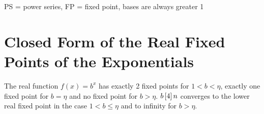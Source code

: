 \documentclass{article}
\numberwithin{equation}{section}
\begin{document}
PS = power series, FP = fixed point, bases are always
greater 1

\appendix
\section{Closed Form of the Real Fixed Points of the Exponentials}
\begin{wellknown}
  \label{wk:exponential:fixedpoint:real}
  The real function $f(x)=b^x$ has exactly 2 fixed points
  for $1<b<\eta$, exactly one fixed point for $b=\eta$ and no
  fixed point for $b>\eta$. $b\operatorname{[4]} n$ converges to the lower real
  fixed point in the case $1<b\le \eta$ and to infinity for $b>\eta$.
\end{wellknown}
\end{document}
